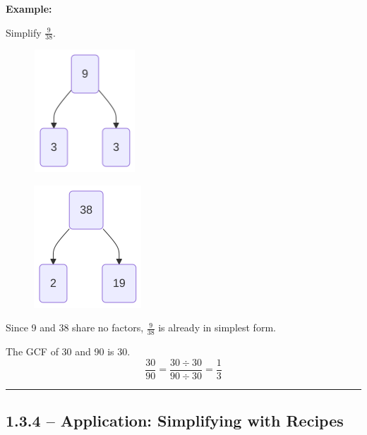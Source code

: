 \documentclass[
  letterpaper,
  DIV=11,
  numbers=noendperiod]{scrreprt}
\begin{document}
\textbf{Example:}

Simplify \(\frac{9}{38}\).

\begin{figure}

\begin{minipage}{0.50\linewidth}

\label{mermaid-diagram}
\includegraphics[width=1.5in,height=1.81in]{chapters/Unit_1/1.3_GCF_&_Simplifying_Fractions_files/figure-latex/mermaid-figure-8.png}

\end{minipage}%
%
\begin{minipage}{0.50\linewidth}

\label{mermaid-diagram}
\includegraphics[width=1.59in,height=1.81in]{chapters/Unit_1/1.3_GCF_&_Simplifying_Fractions_files/figure-latex/mermaid-figure-7.png}

\end{minipage}%

\end{figure}%

Since 9 and 38 share no factors, \(\frac{9}{38}\) is already in simplest
form.

The GCF of 30 and 90 is 30. \[
\frac{30}{90} = \frac{30 \div 30}{90 \div 30} = \frac{1}{3}
\]

\begin{center}\rule{0.5\linewidth}{0.5pt}\end{center}

\subsection*{1.3.4 -- Application: Simplifying with
Recipes}\label{application-simplifying-with-recipes}
\end{document}
